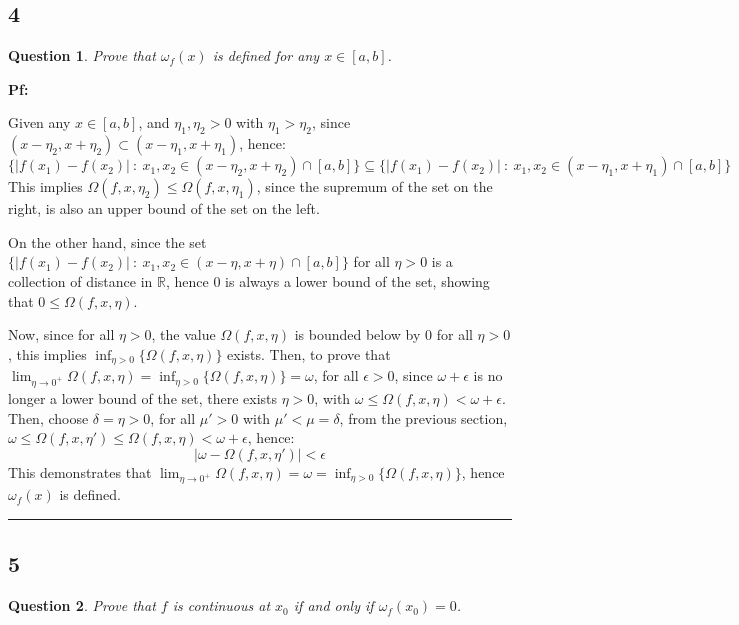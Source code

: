 \documentclass{article}
\newtheorem{question}{Question}
\begin{document}
\subsection*{4}
\begin{myBox2}[]{}
    \begin{question}
        Prove that $\omega_f(x)$ is defined for any $x\in[a,b]$.
    \end{question}
\end{myBox2}

\textbf{Pf:}

Given any $x\in[a,b]$, and $\eta_1,\eta_2>0$ with $\eta_1>\eta_2$, since $(x-\eta_2,x+\eta_2)\subset (x-\eta_1,x+\eta_1)$, hence:
$$\{|f(x_1)-f(x_2)|\ :\ x_1,x_2\in (x-\eta_2,x+\eta_2) \cap [a,b]\}\subseteq \{|f(x_1)-f(x_2)|\ :\ x_1,x_2\in (x-\eta_1,x+\eta_1) \cap [a,b]\}$$
This implies $\Omega(f,x,\eta_2)\leq \Omega(f,x,\eta_1)$, since the supremum of the set on the right, is also an upper bound of the set on the left.

On the other hand, since the set $\{|f(x_1)-f(x_2)|\ :\ x_1,x_2\in (x-\eta,x+\eta) \cap [a,b]\}$ for all $\eta>0$ is a collection of distance in $\mathbb{R}$,
hence $0$ is always a lower bound of the set, showing that $0\leq \Omega(f,x,\eta)$.

\hfill

Now, since for all $\eta>0$, the value $\Omega(f,x,\eta)$ is bounded below by $0$ for all $\eta>0$, this implies $\inf_{\eta>0}\{\Omega(f,x,\eta)\}$ exists.
Then, to prove that $\lim_{\eta\rightarrow 0^+}\Omega(f,x,\eta)=\inf_{\eta>0}\{\Omega(f,x,\eta)\}=\omega$, for all $\epsilon>0$, since $\omega+\epsilon$ is no longer a lower bound of the set,
there exists $\eta>0$, with $\omega \leq \Omega(f,x,\eta)<\omega+\epsilon$. Then, choose $\delta = \eta>0$, 
for all $\mu'>0$ with $\mu'<\mu = \delta$, from the previous section, $\omega \leq \Omega(f,x,\eta')\leq \Omega(f,x,\eta) < \omega+\epsilon$, hence:
$$|\omega-\Omega(f,x,\eta')| < \epsilon$$
This demonstrates that $\lim_{\eta\rightarrow 0^+}\Omega(f,x,\eta)=\omega=\inf_{\eta>0}\{\Omega(f,x,\eta)\}$, hence $\omega_f(x)$ is defined.

\hfill

\rule{15.5cm}{0.1mm}

\break

\subsection*{5}
\begin{myBox2}[]{}
    \begin{question}
        Prove that $f$ is continuous at $x_0$ if and only if $\omega_f(x_0)=0$.
    \end{question}
\end{myBox2}
\end{document}
